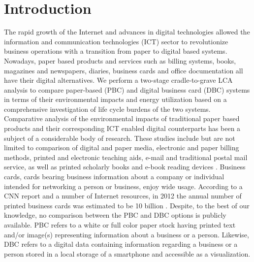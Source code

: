 \documentclass[3p,times,procedia]{elsarticle}
\begin{document}
\section{Introduction}

The rapid growth of the Internet and advances in digital technologies allowed the information and communication technologies (ICT) sector to revolutionize business operations with a transition from paper to digital based systems. Nowadays, paper based products and services such as billing systems, books, magazines and newspapers, diaries, business cards and office documentation all have their digital alternatives. We perform a two-stage cradle-to-grave LCA analysis to compare paper-based (PBC) and digital business card (DBC) systems in terms of their environmental impacts and energy utilization based on a comprehensive investigation of life cycle burdens of the two systems.\\

Comparative analysis of the environmental impacts of traditional paper based products and their corresponding ICT enabled digital counterparts has been a subject of a considerable body of research. These studies include but are not limited to comparison of digital and paper media, electronic and paper billing methods, printed and electronic teaching aids, e-mail and traditional postal mail service, as well as printed scholarly books and e-book reading devices \cite{Bull201410, 6360455, enroth2009, zurkirch2000, kozak2003,hischier2003m}. Business cards, cards bearing business information about a company or individual intended for networking a person or business, enjoy wide usage. According to a CNN report and a number of Internet resources, in 2012 the annual number of printed business cards was estimated to be 10 billion \cite{cnnreport}. Despite, to the best of our knowledge, no comparison between the PBC and DBC options is publicly available. PBC refers to a white or full color paper stock having printed text and/or image(s) representing information about a business or a person. Likewise, DBC refers to a digital data containing information regarding a business or a person stored in a local storage of a smartphone and accessible as a visualization. \\
\end{document}

